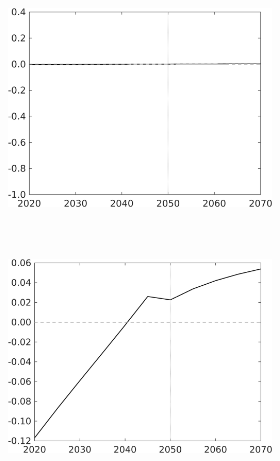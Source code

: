 \begin{figure}[h!!!]
\vspace{3mm}
\begin{subfigure}{1\textwidth}
	\caption{\textbf{Deviation of combined policy from only optimal carbon tax in percent}}\label{fig:opt_Count}
			\vspace{3mm}
	\begin{subfigure}{0.4\textwidth}
		\includegraphics[width=1\textwidth]{../../codding_model/own_basedOnFried/optimalPol_010922_revision/figures/all_13Sept22_Tplus30/CountTAUFPerDif_Opt_target_sgsff_nsk0_xgr0_knspil0_regime4_spillover0_sep0_extern0_PV1_etaa0.79.png}
	\end{subfigure}	
	\begin{minipage}[]{0.1\textwidth}
		\
	\end{minipage}	
	\begin{subfigure}{0.4\textwidth}
		\includegraphics[width=1\textwidth]{../../codding_model/own_basedOnFried/optimalPol_010922_revision/figures/all_13Sept22_Tplus30/CountTAUFPerDif_Opt_target_Hagg_nsk0_xgr0_knspil0_regime4_spillover0_sep0_extern0_PV1_etaa0.79.png}
	\end{subfigure}
\end{subfigure}


\end{figure}

